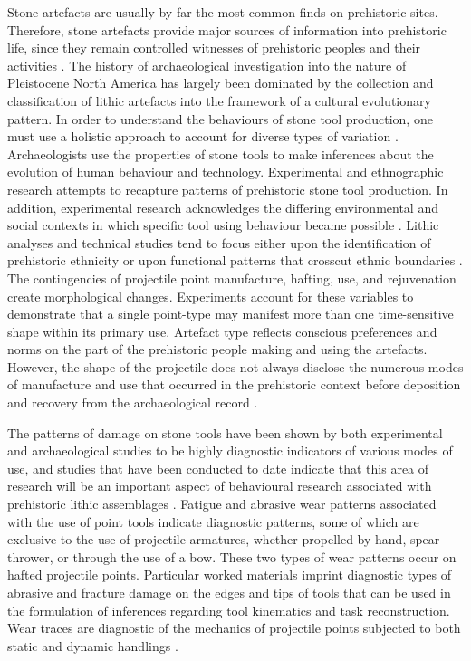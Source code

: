 	
	Stone artefacts are usually by far the most common finds on prehistoric sites. Therefore, stone artefacts provide major sources of information into prehistoric life, since they remain controlled witnesses of prehistoric peoples and their activities \parencite{Cahen_1979}. The history of archaeological investigation into the nature of Pleistocene North America has largely been dominated by the collection and classification of lithic artefacts into the framework of a cultural evolutionary pattern. In order to understand the behaviours of stone tool production, one must use a holistic approach to account for diverse types of variation \parencite{Woods_2011}. 
Archaeologists use the properties of stone tools to make inferences about the evolution of human behaviour and technology. Experimental and ethnographic research attempts to recapture patterns of prehistoric stone tool production. In addition, experimental research acknowledges the differing environmental and social contexts in which specific tool using behaviour became possible \parencite{Thomas_2011}. 
Lithic analyses and technical studies tend to focus either upon the identification of prehistoric ethnicity or upon functional patterns that crosscut ethnic boundaries \parencite{Henry_1989}. The contingencies of projectile point manufacture, hafting, use, and rejuvenation create morphological changes. Experiments account for these variables to demonstrate that a single point-type may manifest more than one time-sensitive shape within its primary use. Artefact type reflects conscious preferences and norms on the part of the prehistoric people making and using the artefacts. However, the shape of the projectile does not always disclose the numerous modes of manufacture and use that occurred in the prehistoric context before deposition and recovery from the archaeological record \parencite{Flenniken_1986}. 

	The patterns of damage on stone tools have been shown by both experimental and archaeological studies to be highly diagnostic indicators of various modes of use, and studies that have been conducted to date indicate that this area of research will be an important aspect of behavioural research associated with prehistoric lithic assemblages \parencites{Anderson_2010}{Dockall_1997}. 
Fatigue and abrasive wear patterns associated with the use of point tools indicate diagnostic patterns, some of which are exclusive to the use of projectile armatures, whether propelled by hand, spear thrower, or through the use of a bow. These two types of wear patterns occur on hafted projectile points. Particular worked materials imprint diagnostic types of abrasive and fracture damage on the edges and tips of tools that can be used in the formulation of inferences regarding tool kinematics and task reconstruction. Wear traces are diagnostic of the mechanics of projectile points subjected to both static and dynamic handlings \parencite{Dockall_1997}.
	
